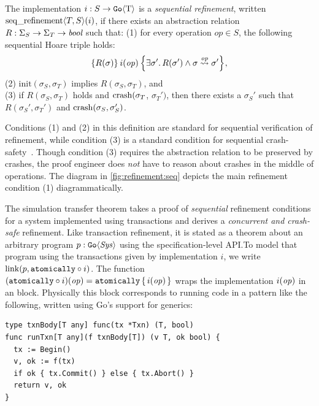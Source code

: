 \begin{definition}
  The implementation $i : S \to \mathtt{Go}\langle \mathrm{T} \rangle$ is a \emph{sequential
    refinement}, written
  $\operatorname{seq\_refinement} \langle T, S \rangle(i)$, if there exists an abstraction relation
  $R : \Sigma_{S} \to \Sigma_{T} \to \textit{bool}$ such that: \newline
(1) for every operation
  $op \in S$, the following sequential Hoare triple holds:
  \[
    \hoare{R(\sigma)}{i(\opv)}{\exists \sigma'.\, R(\sigma') \land \sigma \overset{\opv}{\leadsto} \sigma'},
  \]
(2) $\mathrm{init}(\sigma_{S}, \sigma_{T})$ implies
$R(\sigma_{S}, \sigma_{T})$, and \\
(3) if $R(\sigma_{S}, \sigma_{T})$ holds and $\operatorname{crash}(\sigma_{T}$, $\sigma_{T}')$,
then there exists a $\sigma_{S}'$ such that $R(\sigma_{S}', \sigma_{T}')$ and
$\operatorname{crash}(\sigma_{S}, \sigma_{S}')$.%
  \label{def:seqrefinement}
\end{definition}
%
Conditions (1) and (2) in this definition are standard for sequential
verification of refinement, while condition (3) is a standard condition for sequential crash-safety~\citep{chajed:argosy}. Though condition (3) requires the
abstraction relation to be preserved by crashes, the proof engineer does \emph{not} have to reason about crashes in the middle of operations.
The
diagram in \cref{fig:refinement:seq} depicts the main
refinement condition (1) diagrammatically.

The simulation transfer theorem takes a proof of \emph{sequential} refinement
conditions for a system implemented using transactions and derives a
\emph{concurrent and crash-safe} refinement. Like transaction refinement, it is
stated as a theorem about an arbitrary program $p : \mathtt{Go}\langle \mathit{Sys} \rangle$ using
the specification-level API.\@ To model that program using the transactions given
by implementation $i$, we write $\mathrm{link}(p, \mathtt{atomically}\circ i)$. The function
$(\mathtt{atomically}\circ i)(\mathit{op}) = \mathtt{atomically}\,\{\, i(\mathit{op}) \,\}$ wraps the implementation
$i(\mathit{op})$ in an  block. Physically this  block
corresponds to running code in a pattern like the following, written using Go's
support for generics:
%
\begin{verbatim}
type txnBody[T any] func(tx *Txn) (T, bool)
func runTxn[T any](f txnBody[T]) (v T, ok bool) {
  tx := Begin()
  v, ok := f(tx)
  if ok { tx.Commit() } else { tx.Abort() }
  return v, ok
}
\end{verbatim}

